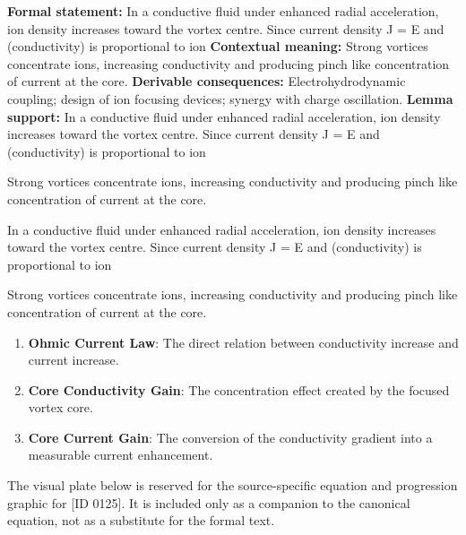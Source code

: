 \begingroup\footnotesize\setlength{\emergencystretch}{3em}\sloppy
\textbf{Formal statement:} In a conductive fluid under enhanced radial acceleration, ion density increases toward the vortex centre. Since current density J =   E and   (conductivity) is proportional to ion
\textbf{Contextual meaning:} Strong vortices concentrate ions, increasing conductivity and producing pinch like concentration of current at the core.
\textbf{Derivable consequences:} Electrohydrodynamic coupling; design of ion focusing devices; synergy with charge oscillation.
\textbf{Lemma support:} In a conductive fluid under enhanced radial acceleration, ion density increases toward the vortex centre. Since current density J =   E and   (conductivity) is proportional to ion\par
\endgroup

Strong vortices concentrate ions, increasing conductivity and producing pinch like concentration of current at the core.

In a conductive fluid under enhanced radial acceleration, ion density increases toward the vortex centre. Since current density J =   E and   (conductivity) is proportional to ion

Strong vortices concentrate ions, increasing conductivity and producing pinch like concentration of current at the core.
\endgroup

\begin{enumerate}[leftmargin=1.6em,itemsep=6pt,topsep=4pt]
\item \textbf{Ohmic Current Law}: The direct relation between conductivity increase and current increase.
\item \textbf{Core Conductivity Gain}: The concentration effect created by the focused vortex core.
\item \textbf{Core Current Gain}: The conversion of the conductivity gradient into a measurable current enhancement.
\end{enumerate}

\begingroup\footnotesize\sloppy
The visual plate below is reserved for the source-specific equation and progression graphic for [ID 0125]. It is included only as a companion to the canonical equation, not as a substitute for the formal text.
\par\endgroup
\ifTZPDarkEdition
{}
\fi

